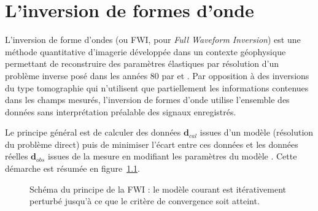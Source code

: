 \chapter{L'inversion de formes d'onde \label{fwi}}
\linenumbers

L'inversion de forme d'ondes (ou FWI, pour \emph{Full Waveform Inversion}) est une méthode quantitative d'imagerie développée dans un contexte géophysique permettant de reconstruire des paramètres élastiques par résolution d'un problème inverse posé dans les années 80 par \cite{lailly} et \cite{tarantola_84}. Par opposition à des inversions du type tomographie qui n'utilisent que partiellement les informations contenues dans les champs mesurés, l'inversion de formes d'onde utilise l'ensemble des données sans interprétation préalable des signaux enregistrés. \\

Le principe général est de calculer des données $\bm{d}_{cal}$ issues d'un modèle (résolution du problème direct)  puis de minimiser l'écart entre ces données et les données réelles $\bm{d}_{obs}$ issues de la mesure en modifiant les paramètres du modèle \citep{virieux_review}. Cette démarche est résumée en figure~\ref{schema_fwi}. \\


\begin{figure}[!h]
	\caption{ Schéma du principe de la FWI : le modèle courant est itérativement perturbé jusqu'à ce que le critère de convergence soit atteint.\label{schema_fwi}}
\end{figure}

